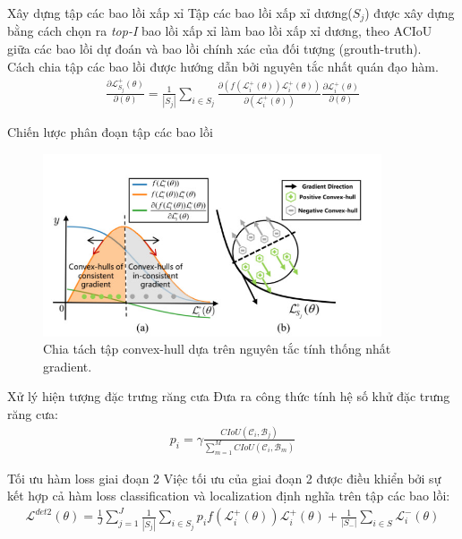 \documentclass[11pt]{beamer}
\theoremstyle{definition}
\theoremstyle{plain}
\theoremstyle{plain}
\theoremstyle{remark}
\begin{document}
	\begin{frame}{Xây dựng tập các bao lồi xấp xỉ}
		Tập các bao lồi xấp xỉ dương($S_j$) được xây dựng bằng cách chọn ra \textit{top-I} bao lồi xấp xỉ làm bao lồi xấp xỉ dương, theo ACIoU giữa các bao lồi dự đoán và bao lồi chính xác của đối tượng (grouth-truth).\\
			Cách chia tập các bao lồi được hướng dẫn bởi nguyên tắc nhất quán đạo hàm.
		\begin{align} \label{ptdd7}
			\frac{\partial\mathcal{L}_{S_j}^+ (\theta)}{\partial (\theta)} = \frac{1}{|S_j|} \sum_{i \in {S_j}} \frac{\partial (f(\mathcal{L}_i^+(\theta))\mathcal{L}_i^{+}(\theta))}{\partial (\mathcal{L}_i^+(\theta))} \frac{\partial \mathcal{L}_i^+ (\theta)}{\partial (\theta)}
		\end{align}
	\end{frame}
	\begin{frame}{Chiến lược phân đoạn tập các bao lồi}
		\begin{figure}[ht!]
			\begin{center}
				\includegraphics[width=10cm]{./Hinh_9.jpg}
				\caption{Chia tách tập convex-hull dựa trên nguyên tắc tính thống nhất gradient.}
				\label{upper_convex_function}
			\end{center}
		\end{figure}
	\end{frame}
	\begin{frame}{Xử lý hiện tượng đặc trưng răng cưa}
		Đưa ra công thức tính hệ số khử đặc trưng răng cưa:
		\begin{align} \label{ptdd8}
			p_i = \gamma \frac{CIoU (\mathcal{C}_i, \mathcal{B}_j)}{\sum_{m=1}^{M} CIoU (\mathcal{C}_i, \mathcal{B}_m)}
		\end{align}
	
		
		
	\end{frame}
	\begin{frame}{Tối ưu hàm loss giai đoạn 2}
		Việc tối ưu của giai đoạn 2 được điều khiển bởi sự kết hợp cả hàm loss classification và localization định nghĩa trên tập các bao lồi:\\
		\begin{align} \label{ptdd10}
			\mathcal{L}^{det2} (\theta) = \frac{1}{J} \sum_{j=1}^{J} \frac{1}{|S_j|} \sum_{i \in {S_j}} p_i f(\mathcal{L}_i^+(\theta)) \mathcal{L}_i^{+}(\theta)  + \frac{1}{|S_-|} \sum_{i \in S} \mathcal{L}_i^- (\theta) 
		\end{align}
	\end{frame}
\end{document}
